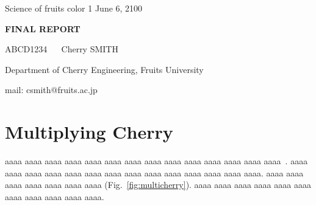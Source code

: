 \documentclass[dvipdfmx,a4j,11pt]{article}
\begin{document}
%
%
%
\noindent
\begin{flushleft} 
\large
Science of fruits color 1    %
\hspace{\fill}
June 6, 2100    %

\end{flushleft}
\begin{center} 
\LARGE 
\bf
{\Huge F}INAL {\Huge R}EPORT    %

\vspace{0.3cm} 
\large \rm
ABCD1234 ~~    %
Cherry SMITH    %
    
Department of Cherry Engineering, Fruits University	%
    
mail: csmith@fruits.ac.jp	%

\end{center}
\normalsize
\vspace{0.5cm} 
%
%
%
\section{Multiplying Cherry}
%
%
%
aaaa aaaa aaaa aaaa aaaa aaaa aaaa 
aaaa aaaa aaaa aaaa aaaa aaaa aaaa~\cite{orange}. 
aaaa aaaa aaaa aaaa aaaa aaaa aaaa 
aaaa aaaa aaaa aaaa aaaa aaaa aaaa. 
aaaa aaaa aaaa aaaa aaaa aaaa aaaa (Fig.~\ref{fig:multicherry}). 
aaaa aaaa aaaa aaaa aaaa aaaa aaaa 
aaaa aaaa aaaa aaaa.

\end{document}
